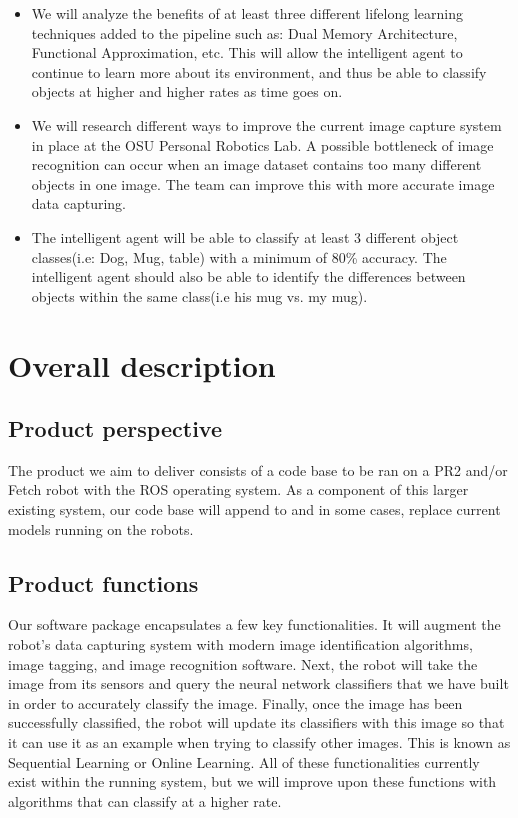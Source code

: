 \documentclass[draftclsnofoot, onecolumn, 10pt, compsoc]{IEEEtran}
\begin{document}
		\begin{itemize}
			\item We will analyze the benefits of at least three different lifelong learning techniques added to the pipeline such as: Dual Memory Architecture, Functional Approximation, etc. This will allow the intelligent agent to continue to learn more about its environment, and thus be able to classify objects at higher and higher rates as time goes on.
			\item We will research different ways to improve the current image capture system in place at the OSU Personal Robotics Lab. A possible bottleneck of image recognition can occur when an image dataset contains too many different objects in one image. The team can improve this with more accurate image data capturing.
			\item The intelligent agent will be able to classify at least 3 different object classes(i.e: Dog, Mug, table) with a minimum of 80\% accuracy. The intelligent agent should also be able to identify the differences between objects within the same class(i.e his mug vs. my mug).
		\end{itemize}

\section{Overall description}
	\subsection{Product perspective}
		The product we aim to deliver consists of a code base to be ran on a PR2 and/or Fetch robot with the ROS operating system. As a component of this larger existing system, our code base will append to and in some cases, replace current models running on the robots.
	
	\subsection{Product functions}
		Our software package encapsulates a few key functionalities. It will augment the robot's data capturing system with modern image identification algorithms, image tagging, and image recognition software. Next, the robot will take the image from its sensors and query the neural network classifiers that we have built in order to accurately classify the image. Finally, once the image has been successfully classified, the robot will update its classifiers with this image so that it can use it as an example when trying to classify other images. This is known as Sequential Learning or Online Learning. All of these functionalities currently exist within the running system, but we will improve upon these functions with algorithms that can classify at a higher rate.
	
\end{document}

